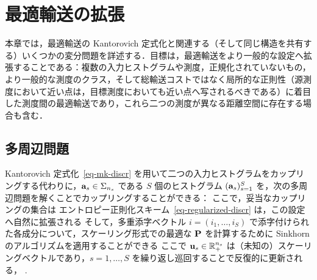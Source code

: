 
\chapter{最適輸送の拡張}
\label{c-extensions}

本章では，最適輸送の Kantorovich 定式化と関連する（そして同じ構造を共有する）いくつかの変分問題を詳述する．目標は，最適輸送をより一般的な設定へ拡張することである：複数の入力ヒストグラムや測度，正規化されていないもの，より一般的な測度のクラス，そして総輸送コストではなく局所的な正則性（源測度において近い点は，目標測度においても近い点へ写されるべきである）に着目した測度間の最適輸送であり，これら二つの測度が異なる距離空間に存在する場合も含む．

\section{多周辺問題}
\label{sec-multimarginal}

Kantorovich 定式化~\eqref{eq-mk-discr} を用いて二つの入力ヒストグラムをカップリングする代わりに，$\a_s \in \simplex_{n_s}$ である $S$ 個のヒストグラム $(\a_s)_{s=1}^S$ を，次の多周辺問題を解くことでカップリングすることができる：
ここで，妥当なカップリングの集合は
エントロピー正則化スキーム~\eqref{eq-regularized-discr} は，この設定へ自然に拡張される
そして，多重添字ベクトル $i=(i_1,\ldots,i_S)$ で添字付けられた各成分について，スケーリング形式での最適な $\P$ を計算するために Sinkhorn のアルゴリズムを適用することができる
ここで $\uD_s \in \RR_+^{n_s}$ は（未知の）スケーリングベクトルであり，$s=1,\ldots,S$ を繰り返し巡回することで反復的に更新される，
.

